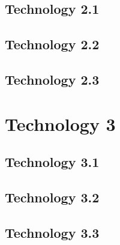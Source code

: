 \documentclass[draftclsnofoot,onecolumn,letterpaper,10pt,compsoc]{IEEEtran}
\begin{document}
	\subsection{Technology 2.1}
	\subsection{Technology 2.2}
	\subsection{Technology 2.3}

\section{Technology 3}
	\subsection{Technology 3.1}
	\subsection{Technology 3.2}
	\subsection{Technology 3.3}
\end{document}
